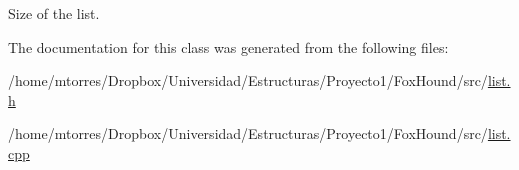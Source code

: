 Size of the list. 



The documentation for this class was generated from the following files\-:\begin{DoxyCompactItemize}
\item 
/home/mtorres/\-Dropbox/\-Universidad/\-Estructuras/\-Proyecto1/\-Fox\-Hound/src/\hyperlink{list_8h}{list.\-h}\item 
/home/mtorres/\-Dropbox/\-Universidad/\-Estructuras/\-Proyecto1/\-Fox\-Hound/src/\hyperlink{list_8cpp}{list.\-cpp}\end{DoxyCompactItemize}
